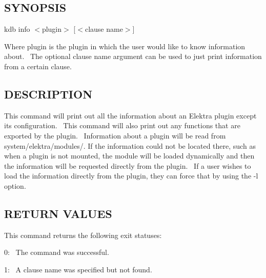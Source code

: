 \subsection*{S\+Y\+N\+O\+P\+S\+IS}

{\ttfamily kdb info $<$plugin$>$ \mbox{[}$<$clause name$>$\mbox{]}}~\newline


Where {\ttfamily plugin} is the plugin in which the user would like to know information about.~\newline
 The optional {\ttfamily clause name} argument can be used to just print information from a certain clause.~\newline


\subsection*{D\+E\+S\+C\+R\+I\+P\+T\+I\+ON}

This command will print out all the information about an Elektra plugin except it\textquotesingle{}s configuration.~\newline
 This command will also print out any functions that are exported by the plugin.~\newline
 Information about a plugin will be read from {\ttfamily system/elektra/modules/}. If the information could not be located there, such as when a plugin is not mounted, the module will be loaded dynamically and then the information will be requested directly from the plugin.~\newline
 If a user wishes to load the information directly from the plugin, they can force that by using the {\ttfamily -\/l} option.~\newline


\subsection*{R\+E\+T\+U\+RN V\+A\+L\+U\+ES}

This command returns the following exit statuses\+:~\newline



\begin{DoxyItemize}
\item 0\+:~\newline
 The command was successful.~\newline

\item 1\+:~\newline
 A {\ttfamily clause name} was specified but not found.~\newline

\end{DoxyItemize}

